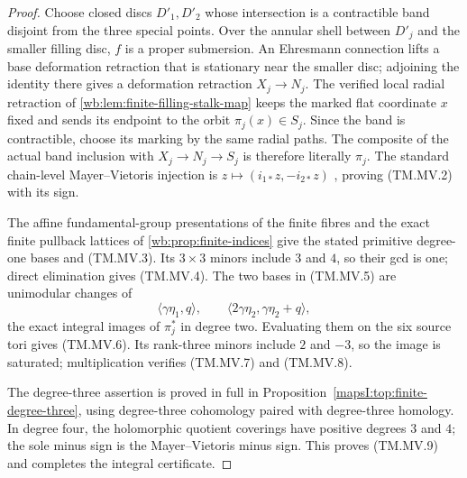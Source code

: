 \begin{proof}
Choose closed discs $D'_1,D'_2$ whose intersection is a contractible band
disjoint from the three special points.  Over the annular shell between
$D'_j$ and the smaller filling disc, $f$ is a proper submersion.  An
Ehresmann connection lifts a base deformation retraction that is stationary
near the smaller disc; adjoining the identity there gives a deformation
retraction $X_j\to N_j$.  The verified local radial retraction of
\cref{wb:lem:finite-filling-stalk-map} keeps the marked flat coordinate $x$
fixed and sends its endpoint to the orbit $\pi_j(x)\in S_j$.  Since the band
is contractible, choose its marking by the same radial paths.  The composite
of the actual band inclusion with $X_j\to N_j\to S_j$ is therefore literally
$\pi_j$.  The standard chain-level Mayer--Vietoris injection is
$z\mapsto(i_{1*}z,-i_{2*}z)$
\cite[\S2.2]{Hatcher2002}, proving (TM.MV.2) with its sign.

The affine fundamental-group presentations of the finite fibres and the
exact finite pullback lattices of \cref{wb:prop:finite-indices} give the stated
primitive degree-one bases and (TM.MV.3).  Its $3\times3$ minors include $3$
and $4$, so their gcd is one; direct elimination gives (TM.MV.4).
The two bases in (TM.MV.5) are unimodular changes of
\[
 \langle\gamma\eta_1,q\rangle,
 \qquad
 \langle2\gamma\eta_2,\gamma\eta_2+q\rangle,
\]
the exact integral images of $\pi_j^*$ in degree two.  Evaluating them on the
six source tori gives (TM.MV.6).  Its rank-three minors include $2$ and $-3$,
so the image is saturated; multiplication verifies (TM.MV.7) and (TM.MV.8).

The degree-three assertion is proved in full in
Proposition~\ref{mapsI:top:finite-degree-three}, using degree-three
cohomology paired with degree-three homology. In degree four, the holomorphic quotient coverings have
positive degrees $3$ and $4$; the sole minus sign is the Mayer--Vietoris
minus sign.  This proves (TM.MV.9) and completes the integral certificate.
\end{proof}

